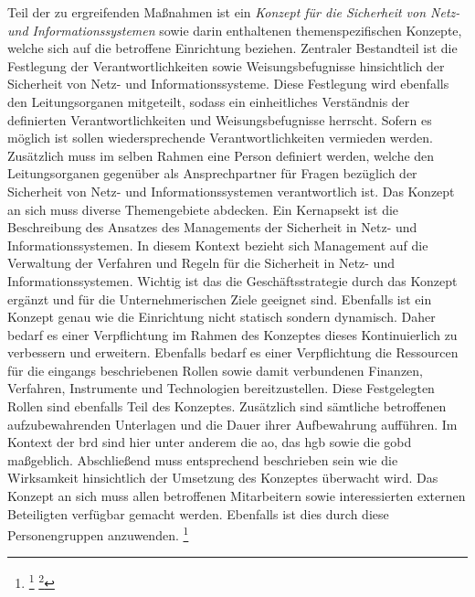 \documentclass[11pt,a4paper,hidelinks]{article}   %
\begin{document}

                Teil der zu ergreifenden Maßnahmen ist ein \emph{Konzept für die Sicherheit von Netz- und Informationssystemen} sowie darin enthaltenen themenspezifischen Konzepte, welche sich auf die betroffene Einrichtung beziehen. Zentraler Bestandteil ist die Festlegung der Verantwortlichkeiten sowie Weisungsbefugnisse hinsichtlich der Sicherheit von Netz- und Informationssysteme. Diese Festlegung wird ebenfalls den Leitungsorganen mitgeteilt, sodass ein einheitliches Verständnis der definierten Verantwortlichkeiten und Weisungsbefugnisse herrscht. Sofern es möglich ist sollen wiedersprechende Verantwortlichkeiten vermieden werden. Zusätzlich muss im selben Rahmen eine Person definiert werden, welche den Leitungsorganen gegenüber als Ansprechpartner für Fragen bezüglich der Sicherheit von Netz- und Informationssystemen verantwortlich ist. Das Konzept an sich muss diverse Themengebiete abdecken. Ein Kernapsekt ist die Beschreibung des Ansatzes des Managements der Sicherheit in Netz- und Informationssystemen. In diesem Kontext bezieht sich Management auf die Verwaltung der Verfahren und Regeln für die Sicherheit in Netz- und Informationssystemen. Wichtig ist das die Geschäftsstrategie durch das Konzept ergänzt und für die Unternehmerischen Ziele geeignet sind. Ebenfalls ist ein Konzept genau wie die Einrichtung nicht statisch sondern dynamisch. Daher bedarf es einer Verpflichtung im Rahmen des Konzeptes dieses Kontinuierlich zu verbessern und erweitern. Ebenfalls bedarf es einer Verpflichtung die Ressourcen für die eingangs beschriebenen Rollen sowie damit verbundenen Finanzen, Verfahren, Instrumente und Technologien bereitzustellen. Diese Festgelegten Rollen sind ebenfalls Teil des Konzeptes. Zusätzlich sind sämtliche betroffenen aufzubewahrenden Unterlagen und die Dauer ihrer Aufbewahrung aufführen. Im Kontext der \gls{brd} sind hier unter anderem die \gls{ao}, das \gls{hgb} sowie die \gls{gobd} maßgeblich. Abschließend muss entsprechend beschrieben sein wie die Wirksamkeit hinsichtlich der Umsetzung des Konzeptes überwacht wird. Das Konzept an sich muss allen betroffenen Mitarbeitern sowie interessierten externen Beteiligten verfügbar gemacht werden. Ebenfalls ist dies durch diese Personengruppen anzuwenden. \footnote{
                    \footcite[Vgl. Anhang, Nummer 1][]{EU2024-2690}
                    \footcite[Referenz für Unternehmen die sich Wandeln][]{MISSING}
                }\medbreak
\end{document}
